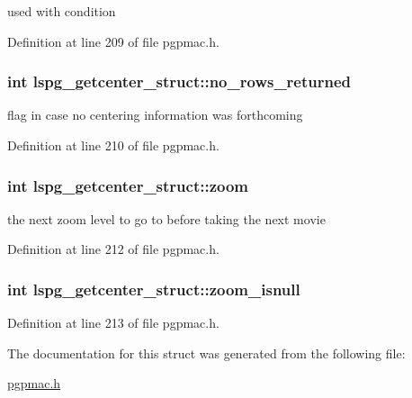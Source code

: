 used with condition 



Definition at line 209 of file pgpmac.\-h.

\hypertarget{structlspg__getcenter__struct_aaeb0ccf4289b4fb306c2bc04ae85b237}{
\subsubsection[{no\-\_\-rows\-\_\-returned}]{\setlength{\rightskip}{0pt plus 5cm}int lspg\-\_\-getcenter\-\_\-struct\-::no\-\_\-rows\-\_\-returned}}\label{structlspg__getcenter__struct_aaeb0ccf4289b4fb306c2bc04ae85b237}


flag in case no centering information was forthcoming 



Definition at line 210 of file pgpmac.\-h.

\hypertarget{structlspg__getcenter__struct_a63e640a925611d2404a1529aea30a853}{
\subsubsection[{zoom}]{\setlength{\rightskip}{0pt plus 5cm}int lspg\-\_\-getcenter\-\_\-struct\-::zoom}}\label{structlspg__getcenter__struct_a63e640a925611d2404a1529aea30a853}


the next zoom level to go to before taking the next movie 



Definition at line 212 of file pgpmac.\-h.

\hypertarget{structlspg__getcenter__struct_a6ca85a8de29039188357b2814acd7803}{
\subsubsection[{zoom\-\_\-isnull}]{\setlength{\rightskip}{0pt plus 5cm}int lspg\-\_\-getcenter\-\_\-struct\-::zoom\-\_\-isnull}}\label{structlspg__getcenter__struct_a6ca85a8de29039188357b2814acd7803}


Definition at line 213 of file pgpmac.\-h.



The documentation for this struct was generated from the following file\-:\begin{DoxyCompactItemize}
\item 
\hyperlink{pgpmac_8h}{pgpmac.\-h}\end{DoxyCompactItemize}
